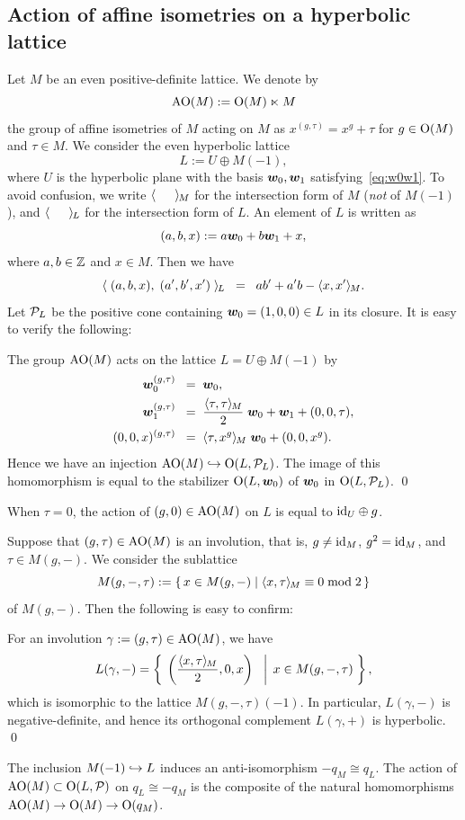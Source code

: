 \documentclass{amsart} %
\begin{document}
\subsection{Action of affine isometries on a hyperbolic lattice}\label{subsec:AOGM}
%
Let $M$ be an even positive-definite lattice.
We denote by 
\[
\mathord{\mathrm{AO}}(M):=\mathord{\mathrm{O}}(M)\ltimes M
\]
 the group of affine isometries of $M$
acting on $M$ as $x^{(g, \tau)}=x^g+\tau$
for $g\in \mathord{\mathrm{O}}(M)$ and $\tau\in M$.
We consider the even hyperbolic lattice
\[
L:=U\oplus M(-1),
\]
where $U$ is the hyperbolic plane with the basis $\boldsymbol{w}_0, \boldsymbol{w}_1$
satisfying~\eqref{eq:w0w1}.
To avoid confusion, we write $\langle \phantom{a,a} \rangle_{\hskip -1pt M}$
for the intersection form of $M$ (\emph{not} of $M(-1)$),
and $\langle \phantom{a,a} \rangle_{\hskip -1pt L}$
for the intersection form of $L$.
An element of $L$ is written as 
\[
(a, b, x):=a\boldsymbol{w}_0+b \boldsymbol{w}_1+ x,
\]
where $a, b\in \mathord{\mathbb{Z}}$ and $x\in M$.
Then we have
\[
\langle \; (a, b, x), \; (a^{\prime}, b^{\prime}, x^{\prime})\; \rangle_{\hskip -1pt L}\;\;=\;\; ab^{\prime}+a^{\prime} b-\langle x, x^{\prime} \rangle_{\hskip -1pt M}.
\]
Let $\mathord{\mathcal{P}}_L$ be the positive cone containing 
$\boldsymbol{w}_0=(1,0, 0)\in L$ in its closure.
It is easy to verify the following:
%
\begin{proposition}\label{prop:embeddingAOG}
The group $\mathord{\mathrm{AO}}(M)$ acts on the lattice $L=U\oplus M(-1)$
by
%
\begin{align*}
\boldsymbol{w}_0^{(g, \tau)} \;\;=\;\; & \boldsymbol{w}_0, \\
\boldsymbol{w}_1^{(g, \tau)} \;\;=\;\; & \frac{\langle \tau, \tau \rangle_{\hskip -1pt M}}{2}\;\boldsymbol{w}_0+\boldsymbol{w}_1+(0,0,\tau), \\
(0,0,x)^{(g, \tau)} \;\;=\;\; &\langle \tau, x^g \rangle_{\hskip -1pt M} \;\boldsymbol{w}_0 + (0,0, x^g).
\end{align*}
Hence we have an injection $\mathord{\mathrm{AO}}(M)\hookrightarrow \mathord{\mathrm{O}}(L, \mathord{\mathcal{P}}_L)$.
The image of this homomorphism is equal to
the stabilizer $\mathord{\mathrm{O}}(L, \boldsymbol{w}_0)$ of $\boldsymbol{w}_0$ in $\mathord{\mathrm{O}}(L, \mathord{\mathcal{P}}_L)$.
\qed
%
\end{proposition}
%
\begin{remark}\label{rem:tau0}
When $\tau=0$, the action of $(g, 0)\in \mathord{\mathrm{AO}}(M)$ on $L$ 
is equal to $\mathord{\mathrm{id}}_U\oplus g$.
\end{remark}
%
Suppose that $(g, \tau)\in \mathord{\mathrm{AO}}(M)$ is an involution, 
that is, $g\ne \mathord{\mathrm{id}}_M$, $g^2=\mathord{\mathrm{id}}_M$, and $\tau\in M(g, -)$.
We consider the sublattice 
\[
M(g, -,\tau):=\{\,{x\in M(g, -)}\mid {\langle x, \tau \rangle_{\hskip -1pt M}\equiv 0 \bmod 2} \,\}
\]
of $M(g, -)$.
Then the following is easy to confirm:
%
\begin{proposition}\label{prop:involL}
For an involution $\gamma:=(g, \tau)\in \mathord{\mathrm{AO}}(M)$, we have 
\[
L(\gamma, -)=\left\{\; \left. {\left(\frac{\langle x, \tau \rangle_{\hskip -1pt M}}{2}, 0, x\right)\;\;} \; \right\vert \; {x \in M(g, -,\tau)} \; \right \},
\]
which is isomorphic to 
the lattice $M(g, -,\tau)(-1)$.
In particular, 
$L(\gamma, -)$ is negative-definite, and 
hence its orthogonal complement $L(\gamma, +)$ is hyperbolic.
\qed
\end{proposition}
%
\begin{remark}
The inclusion $M(-1)\hookrightarrow L$ induces an anti-isomorphism $-q_M\cong q_L$.
The action of $\mathord{\mathrm{AO}}(M)\subset \mathord{\mathrm{O}}(L, \mathord{\mathcal{P}})$ on $q_L\cong -q_M$ 
is the composite of the natural homomorphisms $\mathord{\mathrm{AO}}(M) \to \mathord{\mathrm{O}}(M)\to \mathord{\mathrm{O}}(q_M)$.
\end{remark}
%
\end{document}
